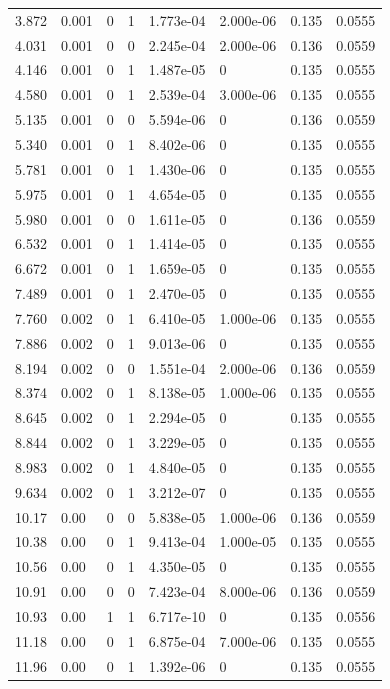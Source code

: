 \documentclass[preview]{standalone}
\begin{document}
{{\begin{tabular}{L{1.2cm}C{1.2cm} C{0.3cm}C{0.5cm} C{1.4cm}C{1.4cm} C{1.4cm}C{1.4cm}}
  3.872  &  0.001  & 0     &  1 &  1.773e-04  & 2.000e-06  & 0.135 &  0.0555   \\ 
  4.031  &  0.001  & 0     &  0 &  2.245e-04  & 2.000e-06  & 0.136 &  0.0559   \\ 
  4.146  &  0.001  & 0     &  1 &  1.487e-05  & 0  & 0.135 &  0.0555   \\ 
  4.580  &  0.001  & 0     &  1 &  2.539e-04  & 3.000e-06  & 0.135 &  0.0555   \\ 
  5.135  &  0.001  & 0     &  0 &  5.594e-06  & 0  & 0.136 &  0.0559   \\ 
  5.340  &  0.001  & 0     &  1 &  8.402e-06  & 0  & 0.135 &  0.0555   \\ 
  5.781  &  0.001  & 0     &  1 &  1.430e-06  & 0  & 0.135 &  0.0555   \\ 
  5.975  &  0.001  & 0     &  1 &  4.654e-05  & 0  & 0.135 &  0.0555   \\ 
  5.980  &  0.001  & 0     &  0 &  1.611e-05  & 0  & 0.136 &  0.0559   \\ 
  6.532  &  0.001  & 0     &  1 &  1.414e-05  & 0  & 0.135 &  0.0555   \\ 
  6.672  &  0.001  & 0     &  1 &  1.659e-05  & 0  & 0.135 &  0.0555   \\ 
  7.489  &  0.001  & 0     &  1 &  2.470e-05  & 0  & 0.135 &  0.0555   \\ 
  7.760  &  0.002  & 0     &  1 &  6.410e-05  & 1.000e-06  & 0.135 &  0.0555   \\ 
  7.886  &  0.002  & 0     &  1 &  9.013e-06  & 0  & 0.135 &  0.0555   \\ 
  8.194  &  0.002  & 0     &  0 &  1.551e-04  & 2.000e-06  & 0.136 &  0.0559   \\ 
  8.374  &  0.002  & 0     &  1 &  8.138e-05  & 1.000e-06  & 0.135 &  0.0555   \\ 
  8.645  &  0.002  & 0     &  1 &  2.294e-05  & 0  & 0.135 &  0.0555   \\ 
  8.844  &  0.002  & 0     &  1 &  3.229e-05  & 0  & 0.135 &  0.0555   \\ 
  8.983  &  0.002  & 0     &  1 &  4.840e-05  & 0  & 0.135 &  0.0555   \\ 
  9.634  &  0.002  & 0     &  1 &  3.212e-07  & 0  & 0.135 &  0.0555   \\ 
  10.17  &  0.00  & 0     &  0 &  5.838e-05  & 1.000e-06  & 0.136 &  0.0559   \\ 
  10.38  &  0.00  & 0     &  1 &  9.413e-04  & 1.000e-05  & 0.135 &  0.0555   \\ 
  10.56  &  0.00  & 0     &  1 &  4.350e-05  & 0  & 0.135 &  0.0555   \\ 
  10.91  &  0.00  & 0     &  0 &  7.423e-04  & 8.000e-06  & 0.136 &  0.0559   \\ 
  10.93  &  0.00  & 1     &  1 &  6.717e-10  & 0  & 0.135 &  0.0556   \\ 
  11.18  &  0.00  & 0     &  1 &  6.875e-04  & 7.000e-06  & 0.135 &  0.0555   \\ 
  11.96  &  0.00  & 0     &  1 &  1.392e-06  & 0  & 0.135 &  0.0555   \\ 
\hline 
\end{tabular} 

}}
\end{document}
